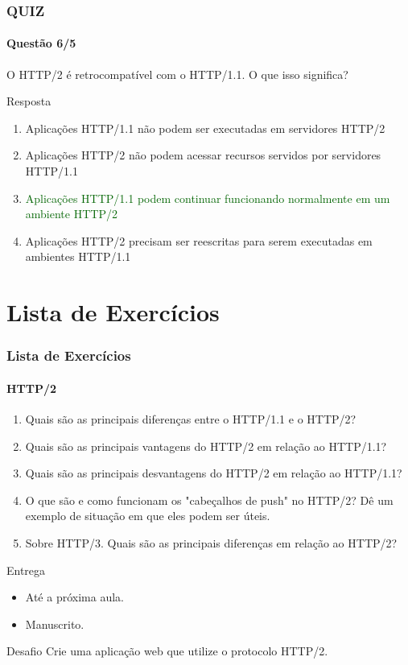 \documentclass[
	9pt, %
	t, %
]{beamer}
\begin{document}
\begin{frame}
	\frametitle{QUIZ}
	\framesubtitle{Questão 6/5}

	{\Large O HTTP/2 é retrocompatível com o HTTP/1.1. O que isso significa? }

	\begin{exampleblock}{Resposta}
		\begin{enumerate}[a]
			\item Aplicações HTTP/1.1 não podem ser executadas em servidores HTTP/2
			\item Aplicações HTTP/2 não podem acessar recursos servidos por servidores HTTP/1.1
			\item \textcolor{darkgreen}{Aplicações HTTP/1.1 podem continuar funcionando normalmente em um ambiente HTTP/2}
			\item Aplicações HTTP/2 precisam ser reescritas para serem executadas em ambientes HTTP/1.1
		\end{enumerate}
	\end{exampleblock}

\end{frame}

\section{Lista de Exercícios}

\begin{frame}
	\frametitle{Lista de Exercícios}
	\framesubtitle{HTTP/2}

	\begin{enumerate}
		\item Quais são as principais diferenças entre o HTTP/1.1 e o HTTP/2?
		\item Quais são as principais vantagens do HTTP/2 em relação ao HTTP/1.1?
		\item Quais são as principais desvantagens do HTTP/2 em relação ao HTTP/1.1?
		\item O que são e como funcionam os "cabeçalhos de push" no HTTP/2? Dê um exemplo de situação em que eles podem ser úteis.
		\item Sobre HTTP/3. Quais são as principais diferenças em relação ao HTTP/2?
	\end{enumerate}

	\begin{exampleblock}{Entrega}
		\begin{itemize}
			\item Até a próxima aula.
			\item Manuscrito.
		\end{itemize}
	\end{exampleblock}

	\begin{block}{Desafio}
		Crie uma aplicação web que utilize o protocolo HTTP/2.
	\end{block}

\end{frame}
\end{document}
